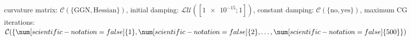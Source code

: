 curvature matrix: $\mathcal{C}(\{\text{GGN},\text{Hessian}\})$, initial damping: $\mathcal{LU}([\num[scientific-notation=true]{1e-15}; \num[scientific-notation=false]{1}])$, constant damping: $\mathcal{C}(\{\text{no},\text{yes}\})$, maximum CG iterations: $\mathcal{C}(\{\num[scientific-notation=false]{1},\num[scientific-notation=false]{2},\text{\dots},\num[scientific-notation=false]{500}\})$